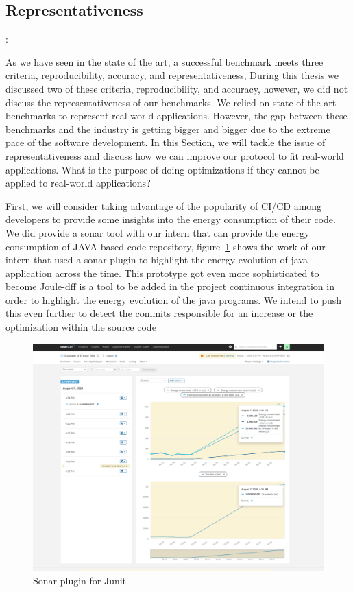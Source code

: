 \subsection*{Representativeness}:

As we have seen in the state of the art, a successful benchmark meets three criteria, reproducibility, accuracy, and representativeness, During this thesis we discussed two of these criteria, reproducibility, and accuracy, however, we did not discuss the representativeness of our benchmarks. We relied on state-of-the-art benchmarks to represent real-world applications. However, the gap between these benchmarks and the industry is getting bigger and bigger due to the extreme pace of the software development. In this Section, we will tackle the issue of representativeness and discuss how we can improve our protocol to fit real-world applications.
What is the purpose of doing optimizations if they cannot be applied to real-world applications?

First, we will consider taking advantage of the popularity of CI/CD among developers to provide some insights into the energy consumption of their code.
We did provide a sonar tool with our intern that can provide the energy consumption of JAVA-based code repository, figure~\ref{fig:JunitSonarplugin} shows the work of our intern that used a sonar plugin to highlight the energy evolution of java application across the time. This prototype got even more sophisticated to become Joule-dff  is a tool to be added in the project continuous integration in order to highlight the energy evolution of the java programs.
We intend to push this even further to detect the  commits responsible for an increase or the optimization within the source code

\begin{figure}[!h]
      \centering
      \includegraphics[width=0.8\linewidth]{chapters/JunitSonarplugin}
      \caption{Sonar plugin for Junit}
      \label{fig:JunitSonarplugin}
\end{figure}

